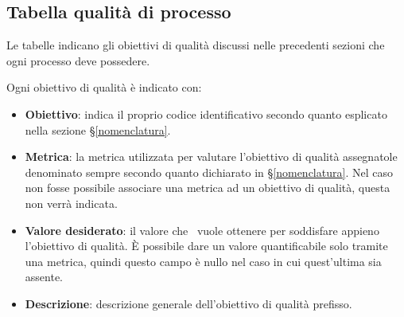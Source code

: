 \subsection{Tabella qualità di processo}
Le tabelle indicano gli obiettivi di qualità discussi nelle precedenti sezioni che ogni processo deve possedere.

Ogni obiettivo di qualità è indicato con:

\begin{itemize}
	\item \textbf{Obiettivo}: indica il proprio codice identificativo secondo quanto esplicato nella sezione \S\ref{nomenclatura}.
	\item \textbf{Metrica}: la metrica utilizzata per valutare l'obiettivo di qualità assegnatole denominato sempre secondo quanto dichiarato in \S\ref{nomenclatura}. Nel caso non fosse possibile associare una metrica ad un obiettivo di qualità, questa non verrà indicata.
	\item \textbf{Valore desiderato}: il valore che \gruppo\ vuole ottenere per soddisfare appieno l'obiettivo di qualità. È possibile dare un valore quantificabile solo tramite una metrica, quindi questo campo è nullo nel caso in cui quest'ultima sia assente.
	\item \textbf{Descrizione}: descrizione generale dell'obiettivo di qualità prefisso.
\end{itemize}

\newcommand{\grigiodesc}{gray!15}

